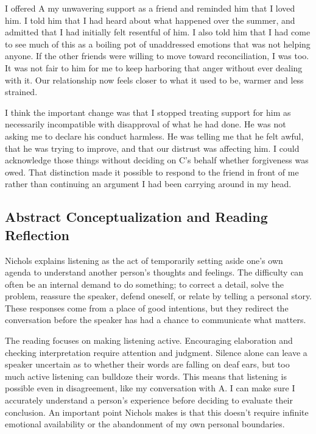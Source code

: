 \documentclass[12pt,stu,biblatex]{apa7}
\begin{document}
I offered A my unwavering support as a friend and reminded him that I loved him.
I told him that I had heard about what happened over the summer, and admitted that I had initially felt resentful of him.
I also told him that I had come to see much of this as a boiling pot of unaddressed emotions that was not helping anyone.
If the other friends were willing to move toward reconciliation, I was too.
It was not fair to him for me to keep harboring that anger without ever dealing with it.
Our relationship now feels closer to what it used to be, warmer and less strained.

I think the important change was that I stopped treating support for him as necessarily incompatible with disapproval of what he had done.
He was not asking me to declare his conduct harmless.
He was telling me that he felt awful, that he was trying to improve, and that our distrust was affecting him.
I could acknowledge those things without deciding on C's behalf whether forgiveness was owed.
That distinction made it possible to respond to the friend in front of me rather than continuing an argument I had been carrying around in my head.

\subsection{Abstract Conceptualization and Reading Reflection}
Nichols \parencite{nichols2009listening} explains listening as the act of temporarily setting aside one's own agenda to understand another person's thoughts and feelings.
The difficulty can often be an internal demand to do something; to correct a detail, solve the problem, reassure the speaker, defend oneself, or relate by telling a personal story.
These responses come from a place of good intentions, but they redirect the conversation before the speaker has had a chance to communicate what matters.

The reading focuses on making listening active.
Encouraging elaboration and checking interpretation require attention and judgment.
Silence alone can leave a speaker uncertain as to whether their words are falling on deaf ears, but too much active listening can bulldoze their words.
This means that listening is possible even in disagreement, like my conversation with A.
I can make sure I accurately understand a person's experience before deciding to evaluate their conclusion.
An important point Nichols makes is that this doesn't require infinite emotional availability or the abandonment of my own personal boundaries.
\end{document}
